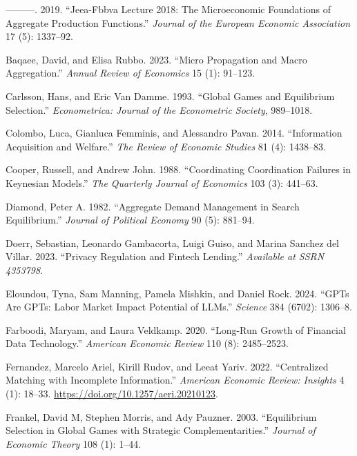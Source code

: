 \documentclass[
]{article}
\newlength{\cslhangindent}
\newenvironment{CSLReferences}[2] %
 {\begin{list}{}{%
  \setlength{\itemindent}{0pt}
  \setlength{\leftmargin}{0pt}
  \setlength{\parsep}{0pt}
  \ifodd #1
   \setlength{\leftmargin}{\cslhangindent}
   \setlength{\itemindent}{-1\cslhangindent}
  \fi
  \setlength{\itemsep}{#2\baselineskip}}}
 {\end{list}}
\theoremstyle{definition}
\theoremstyle{plain}
\theoremstyle{remark}
\begin{document}
\begin{CSLReferences}{1}{0}
---------. 2019. {``Jeea-Fbbva Lecture 2018: The Microeconomic
Foundations of Aggregate Production Functions.''} \emph{Journal of the
European Economic Association} 17 (5): 1337--92.

Baqaee, David, and Elisa Rubbo. 2023. {``Micro Propagation and Macro
Aggregation.''} \emph{Annual Review of Economics} 15 (1): 91--123.

Carlsson, Hans, and Eric Van Damme. 1993. {``Global Games and
Equilibrium Selection.''} \emph{Econometrica: Journal of the Econometric
Society}, 989--1018.

Colombo, Luca, Gianluca Femminis, and Alessandro Pavan. 2014.
{``Information Acquisition and Welfare.''} \emph{The Review of Economic
Studies} 81 (4): 1438--83.

Cooper, Russell, and Andrew John. 1988. {``Coordinating Coordination
Failures in Keynesian Models.''} \emph{The Quarterly Journal of
Economics} 103 (3): 441--63.

Diamond, Peter A. 1982. {``Aggregate Demand Management in Search
Equilibrium.''} \emph{Journal of Political Economy} 90 (5): 881--94.

Doerr, Sebastian, Leonardo Gambacorta, Luigi Guiso, and Marina Sanchez
del Villar. 2023. {``Privacy Regulation and Fintech Lending.''}
\emph{Available at SSRN 4353798}.

Eloundou, Tyna, Sam Manning, Pamela Mishkin, and Daniel Rock. 2024.
{``GPTs Are GPTs: Labor Market Impact Potential of LLMs.''}
\emph{Science} 384 (6702): 1306--8.

Farboodi, Maryam, and Laura Veldkamp. 2020. {``Long-Run Growth of
Financial Data Technology.''} \emph{American Economic Review} 110 (8):
2485--2523.

Fernandez, Marcelo Ariel, Kirill Rudov, and Leeat Yariv. 2022.
{``Centralized Matching with Incomplete Information.''} \emph{American
Economic Review: Insights} 4 (1): 18--33.
\url{https://doi.org/10.1257/aeri.20210123}.

Frankel, David M, Stephen Morris, and Ady Pauzner. 2003. {``Equilibrium
Selection in Global Games with Strategic Complementarities.''}
\emph{Journal of Economic Theory} 108 (1): 1--44.


\end{CSLReferences}
\end{document}
